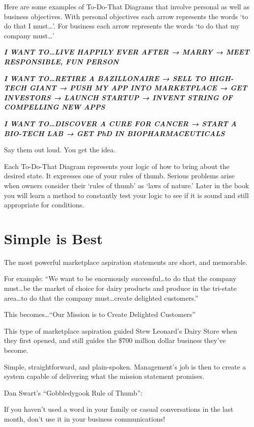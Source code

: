 \documentclass[
]{book}
\begin{document}
Here are some examples of To-Do-That Diagrams that involve personal as well as business objectives. With personal objectives each arrow represents the words `to do that I must\ldots{}'. For business each arrow represents the words `to do that my company must\ldots{}'

{\textbf{\emph{I WANT TO\ldots LIVE HAPPILY EVER AFTER → MARRY → MEET RESPONSIBLE, FUN PERSON}}}

{\textbf{\emph{I WANT TO\ldots RETIRE A BAZILLONAIRE → SELL TO HIGH-TECH GIANT → PUSH MY APP INTO MARKETPLACE → GET INVESTORS → LAUNCH STARTUP → INVENT STRING OF COMPELLING NEW APPS}}}

{\textbf{\emph{I WANT TO\ldots DISCOVER A CURE FOR CANCER → START A BIO-TECH LAB → GET PhD IN BIOPHARMACEUTICALS}}}

Say them out loud. You get the idea.

Each To-Do-That Diagram represents your logic of how to bring about the desired state. It expresses one of your rules of thumb. Serious problems arise when owners consider their `rules of thumb' as `laws of nature.' Later in the book you will learn a method to constantly test your logic to see if it is sound and still appropriate for conditions.

\hypertarget{simple-is-best}{%
\section{Simple is Best}\label{simple-is-best}}

The most powerful marketplace aspiration statements are short, and memorable.

{For example: ``We want to be enormously successful\ldots to do that the company must\ldots be the market of choice for dairy products and produce in the tri-state area\ldots to do that the company must\ldots create delighted customers.''}

This becomes\ldots{}{``Our Mission is to Create Delighted Customers''}

This type of marketplace aspiration guided Stew Leonard's Dairy Store when they first opened, and still guides the \$700 million dollar business they've become.

Simple, straightforward, and plain-spoken. Management's job is then to create a system capable of delivering what the mission statement promises.

{Dan Swart's ``Gobbledygook Rule of Thumb'':}

If you haven't used a word in your family or casual conversations in the last month, {don't use it in your business communications!}
\end{document}
